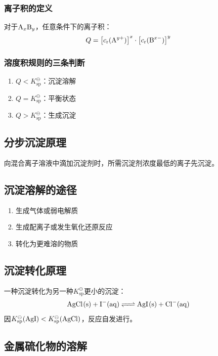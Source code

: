 \subsubsection{离子积的定义}
对于$\ce{A_{x}B_{y}}$，任意条件下的离子积：
\[
Q = \left[ c_{\text{r}}(\ce{A^{y+}}) \right]^x \cdot \left[ c_{\text{r}}(\ce{B^{x-}}) \right]^y
\]

\subsubsection{溶度积规则的三条判断}
\begin{enumerate}
    \item $Q < K_{\text{sp}}^{\ominus}$：沉淀溶解
    \item $Q = K_{\text{sp}}^{\ominus}$：平衡状态  
    \item $Q > K_{\text{sp}}^{\ominus}$：生成沉淀
\end{enumerate}

\subsection{分步沉淀原理}

向混合离子溶液中滴加沉淀剂时，所需沉淀剂浓度最低的离子先沉淀。

\subsection{沉淀溶解的途径}

\begin{enumerate}
    \item 生成气体或弱电解质
    \item 生成配离子或发生氧化还原反应
    \item 转化为更难溶的物质
\end{enumerate}

\subsection{沉淀转化原理}

一种沉淀转化为另一种$K_{\text{sp}}^{\ominus}$更小的沉淀：
\[
\ce{AgCl(s) + I^-(aq) <=> AgI(s) + Cl^-(aq)}
\]
因$K_{\text{sp}}^{\ominus}(\ce{AgI}) < K_{\text{sp}}^{\ominus}(\ce{AgCl})$，反应自发进行。

\subsection{金属硫化物的溶解}

